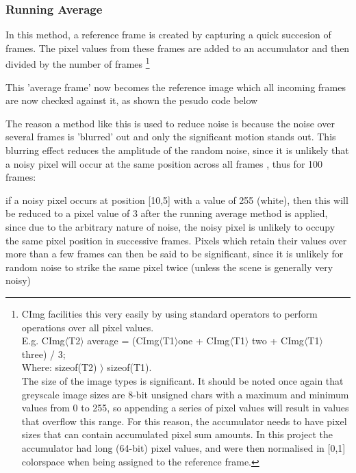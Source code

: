 {{\subsubsection{Running Average}
In this method, a reference frame is created by capturing a quick succesion of frames. The pixel values from these frames are added to an accumulator and then divided by the number of frames  
\footnote{CImg facilities this very easily by using standard operators to perform operations over all pixel values.
\\ E.g.  CImg\(\langle\)T2\(\rangle\) average =  (CImg\(\langle\)T1\(\rangle\)one + CImg\(\langle\)T1\(\rangle\) two + CImg\(\langle\)T1\(\rangle\) three) / 3; \\
Where: sizeof(T2)  \(\rangle\)  sizeof(T1).
\\The size of the image types is significant. It should be noted once again that greyscale image sizes are 8-bit unsigned chars with a maximum and minimum values from 0 to 255, so appending a series of pixel values will result in values that overflow this range. For this reason, the accumulator needs to have pixel sizes that can contain accumulated pixel sum amounts. In this project the accumulator had long (64-bit) pixel values, and were then normalised in [0,1] colorspace when being assigned to the reference frame.}
 
This 'average frame' now becomes the reference image which all incoming frames are now checked against it, as shown the pesudo code below

\begin{frame}{}
	\vspace{-20pt}
	
\end{frame}

The reason a method like this is used to reduce noise is because the noise over several frames is 'blurred' out and only the significant motion stands out. This blurring effect reduces the amplitude of the random noise, since it is unlikely that a noisy pixel will occur at the same position across all frames , thus for 100 frames:

if a noisy pixel occurs at position [10,5] with a value of 255 (white), then this will be reduced to a pixel value of 3 after the running average method is applied, since due to the arbitrary nature of noise, the noisy pixel is unlikely to occupy the same pixel position in successive frames. Pixels which retain their values over more than a few frames can then be said to be significant, since it is unlikely for random noise to strike the same pixel twice (unless the scene is generally very noisy)

}}
